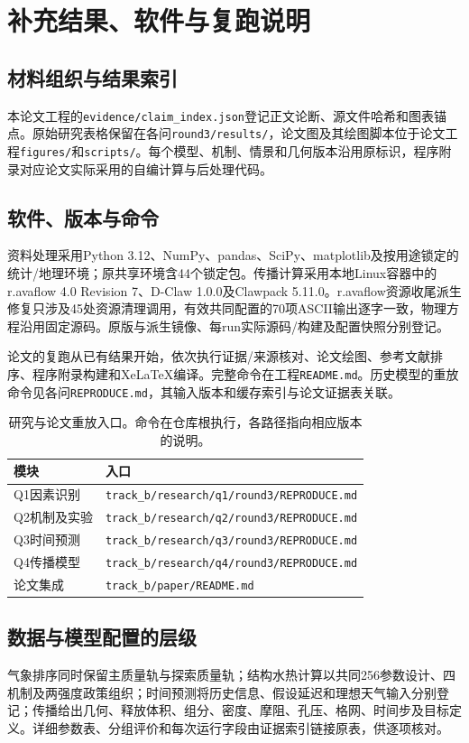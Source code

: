 \section{补充结果、软件与复跑说明}\label{app:supplement}
\subsection{材料组织与结果索引}
本论文工程的\texttt{evidence/claim\_index.json}登记正文论断、源文件哈希和图表锚点。原始研究表格保留在各问\texttt{round3/results/}，论文图及其绘图脚本位于论文工程\texttt{figures/}和\texttt{scripts/}。每个模型、机制、情景和几何版本沿用原标识，程序附录对应论文实际采用的自编计算与后处理代码。

\subsection{软件、版本与命令}
资料处理采用Python 3.12、NumPy、pandas、SciPy、matplotlib及按用途锁定的统计/地理环境；原共享环境含44个锁定包。传播计算采用本地Linux容器中的r.avaflow 4.0 Revision 7、D-Claw 1.0.0及Clawpack 5.11.0。r.avaflow资源收尾派生修复只涉及45处资源清理调用，有效共同配置的70项ASCII输出逐字一致，物理方程沿用固定源码。原版与派生镜像、每run实际源码/构建及配置快照分别登记。

论文的复跑从已有结果开始，依次执行证据/来源核对、论文绘图、参考文献排序、程序附录构建和XeLaTeX编译。完整命令在工程\texttt{README.md}。历史模型的重放命令见各问\texttt{REPRODUCE.md}，其输入版本和缓存索引与论文证据表关联。

\begin{table}[htbp]\centering\small
\caption{研究与论文重放入口。命令在仓库根执行，各路径指向相应版本的说明。}
\begin{tabularx}{\linewidth}{p{2.3cm}Y}
\toprule
模块 & 入口\\\midrule
Q1因素识别 & \texttt{track\_b/research/q1/round3/REPRODUCE.md}\\
Q2机制及实验 & \texttt{track\_b/research/q2/round3/REPRODUCE.md}\\
Q3时间预测 & \texttt{track\_b/research/q3/round3/REPRODUCE.md}\\
Q4传播模型 & \texttt{track\_b/research/q4/round3/REPRODUCE.md}\\
论文集成 & \texttt{track\_b/paper/README.md}\\\bottomrule
\end{tabularx}\end{table}

\subsection{数据与模型配置的层级}
气象排序同时保留主质量轨与探索质量轨；结构水热计算以共同256参数设计、四机制及两强度政策组织；时间预测将历史信息、假设延迟和理想天气输入分别登记；传播给出几何、释放体积、组分、密度、摩阻、孔压、格网、时间步及目标定义。详细参数表、分组评价和每次运行字段由证据索引链接原表，供逐项核对。

